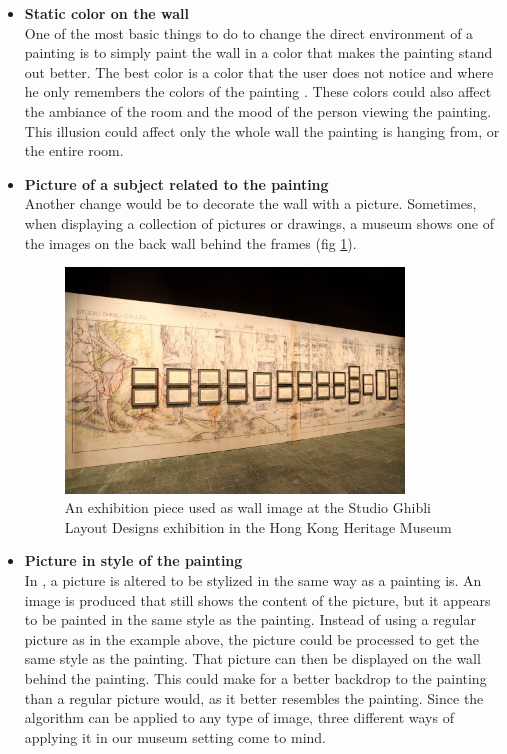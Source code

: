 \documentclass[a4paper]{article}
\begin{document}
\begin{itemize}

\item{\textbf{Static color on the wall}} %
\\One of the most basic things to do to change the direct environment of a painting is to simply paint the wall in a color that makes the painting stand out better. The best color is a color that the user does not notice and where he only remembers the colors of the painting \cite{colorwall}. These colors could also affect the ambiance of the room and the mood of the person\cite{mood} viewing the painting. This illusion could affect only the whole wall the painting is hanging from, or the entire room.

\item{\textbf{Picture of a subject related to the painting}} 
\\Another change would be to decorate the wall with a picture. Sometimes, when displaying a collection of pictures or drawings, a museum shows one of the images on the back wall behind the frames (fig \ref{fig:picturewall}).

\begin{figure}[h!]
\label{fig:picturewall}
\centering
\includegraphics[width = 90mm]{PictureWall.jpg}
\caption{An exhibition piece used as wall image at the Studio Ghibli Layout Designs exhibition in the Hong Kong Heritage Museum}
\end{figure}

\item{\textbf{Picture in style of the painting}}
\\In \cite{gatys}, a picture is altered to be stylized in the same way as a painting is. An image is produced that still shows the content of the picture, but it appears to be painted in the same style as the painting. Instead of using a regular picture as in the example above, the picture could be processed to get the same style as the painting. That picture can then be displayed on the wall behind the painting. This could make for a better backdrop to the painting than a regular picture would, as it better resembles the painting. Since the algorithm can be applied to any type of image, three different ways of applying it in our museum setting come to mind. 


\end{itemize}
\end{document}
